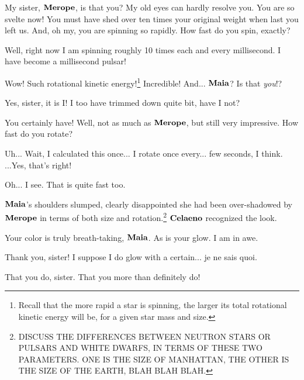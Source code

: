 \documentclass[main.tex]{subfiles}
\begin{document}
\par \Celaeno My sister, $\Merope$, is that you?  My old eyes can hardly resolve you.  You are so svelte now!  You must have shed over ten times your original weight when last you left us.  And, oh my, you are spinning so rapidly.  How fast do you spin, exactly?

\par \Merope Well, right now I am spinning roughly 10 times each and every millisecond.  I have become a millisecond pulsar!  

\par \Celaeno Wow!  Such rotational kinetic energy!\footnote{Recall that the more rapid a star is spinning, the larger its total rotational kinetic energy will be, for a given star mass and size.}  Incredible!  And... $\Maia$?  Is that \textit{you}!?

\par \Maia Yes, sister, it is I!  I too have trimmed down quite bit, have I not?

\par \Celaeno You certainly have!  Well, not as much as $\Merope$, but still very impressive.  How fast do you rotate?

\par \Maia Uh... Wait, I calculated this once... I rotate once every... few seconds, I think.  ...Yes, that's right!

\par \Celaeno Oh... I see.  That is quite fast too.

\par \nar $\Maia$'s shoulders slumped, clearly disappointed she had been over-shadowed by $\Merope$ in terms of both size and rotation.\footnote{DISCUSS THE DIFFERENCES BETWEEN NEUTRON STARS OR PULSARS AND WHITE DWARFS, IN TERMS OF THESE TWO PARAMETERS.  ONE IS THE SIZE OF MANHATTAN, THE OTHER IS THE SIZE OF THE EARTH, BLAH BLAH BLAH.}  $\Celaeno$ recognized the look.

\par \Celaeno Your color is truly breath-taking, $\Maia$.  As is your glow.  I am in awe.

\par \Maia Thank you, sister!  I suppose I do glow with a certain... je ne sais quoi.

\par \Celaeno That you do, sister.  That you more than definitely do!
\end{document}
